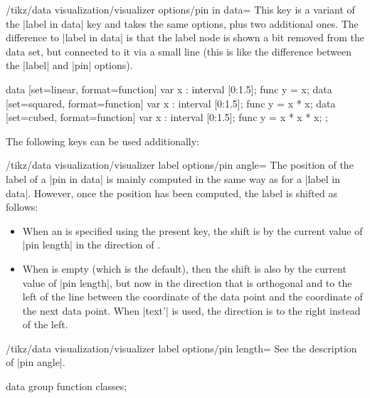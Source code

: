 \begin{key}{/tikz/data visualization/visualizer options/pin in data=}
  This key is a variant of the |label in data| key and takes the same
  options, plus two additional ones. The difference to |label in data|
  is that the label node is shown a bit removed from the data set, but
  connected to it via a small line (this is like the difference
  between the |label| and |pin| options).
\begin{codeexample}[width=6.3cm]
\tikz \datavisualization [
  scientific axes=clean,
  visualize as smooth line/.list={linear, squared, cubed},
  linear ={pin in data={text=$2x$}},
  squared={pin in data={text=$x^2$}},
  cubed  ={pin in data={text=$x^3$}}]
data [set=linear, format=function] {
  var x : interval [0:1.5];
  func y = \value x;
}
data [set=squared, format=function] {
  var x : interval [0:1.5];
  func y = \value x * \value x;
}
data [set=cubed, format=function] {
  var x : interval [0:1.5];
  func y = \value x * \value x * \value x;
};
\end{codeexample}
  The following keys can be used additionally:
  \begin{key}{/tikz/data visualization/visualizer label options/pin angle=}
    The position of the label of a |pin in data| is mainly computed in
    the same way as for a |label in data|. However, once the position
    has been computed, the label is shifted as follows:
    \begin{itemize}
    \item When an  is specified using the present key, the
      shift is by the current value of |pin length| in the direction
      of .
    \item When  is empty (which is the default), then the
      shift is also by the current value of |pin length|, but now in
      the direction that is orthogonal and to the left of the line
      between the coordinate of the data point and the coordinate of
      the next data point. When |text'| is used, the direction is to
      the right instead of the left.
    \end{itemize}
  \end{key}
  
  \begin{key}{/tikz/data visualization/visualizer label options/pin length=}
    See the description of |pin angle|.
  \end{key}  

\begin{codeexample}[width=6.3cm]
\tikz \datavisualization [
  school book axes,
  x axis={label=$x$},
  visualize as smooth line/.list={log, lin, squared, exp},
  every data set label/.append style={text colored},
  log=    {pin in data={text'=$\log x$, when=y is -1}},
  lin=    {pin in data={text=$x/2$, when=x is 2,
                        pin length=1ex}},
  squared={pin in data={text=$x^2$, when=x is 1.1,
                        pin angle=230}},
  exp=    {label in data={text=$e^x$, when=x is -2}},
  style sheet=vary hue]
data group {function classes};
\end{codeexample}
\end{key}



